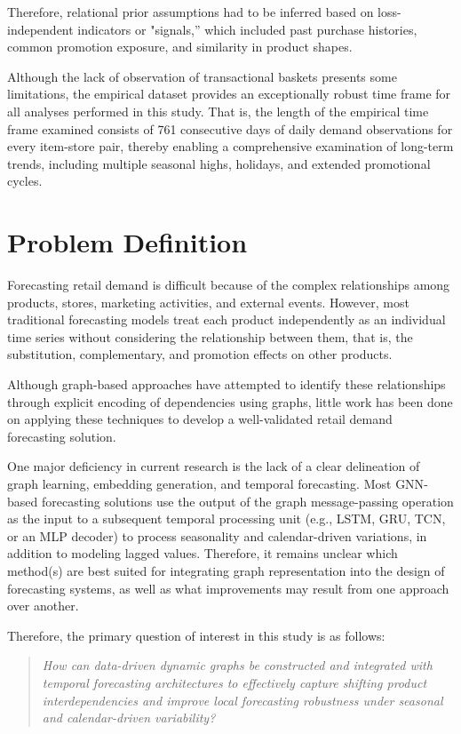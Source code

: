 Therefore, relational prior assumptions had to be inferred based on loss-independent indicators or "signals,” which included past purchase histories, common promotion exposure, and similarity in product shapes.

Although the lack of observation of transactional baskets presents some limitations, the empirical dataset provides an exceptionally robust time frame for all analyses performed in this study. That is, the length of the empirical time frame examined consists of 761 consecutive days of daily demand observations for every item-store pair, thereby enabling a comprehensive examination of long-term trends, including multiple seasonal highs, holidays, and extended promotional cycles.

\section{Problem Definition} \label{sec:problem_definition}

Forecasting retail demand is difficult because of the complex relationships among products, stores, marketing activities, and external events. However, most traditional forecasting models treat each product independently as an individual time series without considering the relationship between them, that is, the substitution, complementary, and promotion effects on other products.

Although graph-based approaches have attempted to identify these relationships through explicit encoding of dependencies using graphs, little work has been done on applying these techniques to develop a well-validated retail demand forecasting solution.

One major deficiency in current research is the lack of a clear delineation of graph learning, embedding generation, and temporal forecasting. Most \ac{GNN}-based forecasting solutions use the output of the graph message-passing operation as the input to a subsequent temporal processing unit (e.g., \ac{LSTM}, \ac{GRU}, \ac{TCN}, or an \ac{MLP} decoder) to process seasonality and calendar-driven variations, in addition to modeling lagged values. Therefore, it remains unclear which method(s) are best suited for integrating graph representation into the design of forecasting systems, as well as what improvements may result from one approach over another.

Therefore, the primary question of interest in this study is as follows:

\begin{quote}
\textit{How can data-driven dynamic graphs be constructed and integrated with temporal forecasting architectures to effectively capture shifting product interdependencies and improve local forecasting robustness under seasonal and calendar-driven variability?}
\end{quote}




